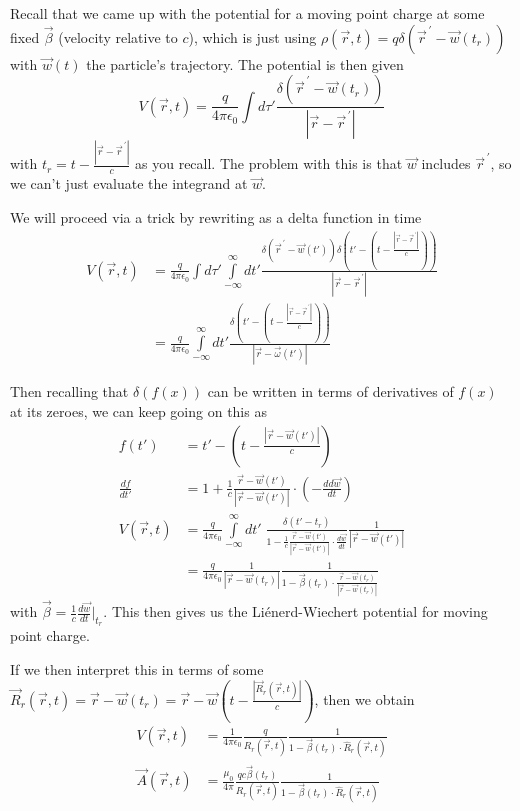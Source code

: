 \documentclass[10pt]{report}
\newcommand{\rd}[2]{\frac{d#1}{d#2}}
\newcommand{\pvec}[1]{\vec{#1}^{\,\prime}}
\newcommand{\abs}[1]{\left|#1\right|}
\begin{document}
Recall that we came up with the potential for a moving point charge at some fixed $\vec{\beta}$ (velocity relative to $c$), which is just using $\rho(\vec{r},t) = q\delta(\pvec{r} - \vec{w}(t_r))$ with $\vec{w}(t)$ the particle's trajectory. The potential is then given
\begin{equation}
    V(\vec{r},t) = \frac{q}{4\pi\epsilon_0}\int d\tau' \frac{\delta\left( \pvec{r} - \vec{w}(t_r) \right)}{\abs{\vec{r} - \pvec{r}}}
\end{equation}
with $t_r = t - \frac{\abs{\vec{r} - \pvec{r}}}{c}$ as you recall. The problem with this is that $\vec{w}$ includes $\pvec{r}$, so we can't just evaluate the integrand at $\vec{w}$.

We will proceed via a trick by rewriting as a delta function in time
\begin{align}
    V(\vec{r},t) &= \frac{q}{4\pi\epsilon_0}\int d\tau'\int\limits_{-\infty}^{\infty}dt'\frac{\delta\left( \pvec{r} - \vec{w}(t') \right)\delta\left( t' - \left( t - \frac{\abs{\vec{r} - \pvec{r}}}{c} \right) \right)}{\abs{\vec{r} - \pvec{r}}}\\
    &= \frac{q}{4\pi\epsilon_0}\int\limits_{-\infty}^{\infty}dt' \frac{\delta\left( t' - \left( t - \frac{\abs{\vec{r} - \pvec{r}}}{c} \right) \right)}{\abs{\vec{r} - \vec{\omega}(t')}}
\end{align}

Then recalling that $\delta(f(x))$ can be written in terms of derivatives of $f(x)$ at its zeroes, we can keep going on this as
\begin{align}
    f(t') &= t' - \left(t - \frac{\abs{\vec{r} - \vec{w}(t')}}{c}\right)\\
    \rd{f}{t'} &= 1 + \frac{1}{c}\frac{\vec{r} - \vec{w}(t')}{\abs{\vec{r} - \vec{w}(t')}}\cdot\left( -\rd{d\vec{w}}{t} \right)\\
    V(\vec{r},t) &= \frac{q}{4\pi\epsilon_0}\int\limits_{-\infty}^{\infty}dt'\;\frac{\delta(t' - t_r)}{1 - \frac{1}{c}\frac{\vec{r} - \vec{w}(t')}{\abs{\vec{r} - \vec{w}(t')}}\cdot \rd{\vec{w}}{t}}\frac{1}{\abs{\vec{r} - \vec{w}(t')}}\\
    &= \frac{q}{4\pi\epsilon_0}\frac{1}{\abs{\vec{r} - \vec{w}(t_r)}}\frac{1}{1 - \vec{\beta}(t_r)\cdot\frac{\vec{r} - \vec{w}(t_r)}{\abs{\vec{r} - \vec{w}(t_r)}}}
\end{align}
with $\vec{\beta} = \frac{1}{c}\rd{\vec{w}}{t}\Big|_{t_r}$. This then gives us the Li\'enerd-Wiechert potential for moving point charge.

If we then interpret this in terms of some $\vec{R}_r(\vec{r},t) = \vec{r} - \vec{w}(t_r) = \vec{r} - \vec{w}\left( t - \frac{\abs{\vec{R}_r(\vec{r},t)}}{c} \right)$, then we obtain
\begin{align}
    V(\vec{r},t) &= \frac{1}{4\pi\epsilon_0}\frac{q}{R_r(\vec{r},t)}\frac{1}{1 - \vec{\beta}(t_r) \cdot \hat{R}_r(\vec{r},t)}\label{5.27.pots}\\
    \vec{A}(\vec{r},t) &= \frac{\mu_0}{4\pi}\frac{qc\vec{\beta}(t_r)}{R_r(\vec{r},t)}\frac{1}{1 - \vec{\beta}(t_r) \cdot \hat{R}_r(\vec{r},t)}
\end{align}
\end{document}
